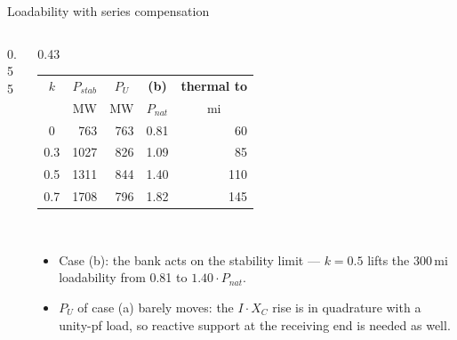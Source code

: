 \begin{frame}{Loadability with series compensation}
  \begin{columns}[c,onlytextwidth]
    \begin{column}{0.55\textwidth}\centering
    \end{column}
    \begin{column}{0.43\textwidth}
      \renewcommand{\arraystretch}{1.15}
      {\footnotesize
      \begin{tabular}{@{}c r r r r@{}}
        \textbf{$k$} & \multicolumn{1}{c}{\textbf{$P_{stab}$}}
                     & \multicolumn{1}{c}{\textbf{$P_{U}$}}
                     & \multicolumn{1}{c}{\textbf{(b)}}
                     & \multicolumn{1}{c}{\textbf{thermal to}} \\
                     & \multicolumn{1}{c}{MW} & \multicolumn{1}{c}{MW}
                     & \multicolumn{1}{c}{$P_{nat}$} & \multicolumn{1}{c}{mi} \\
        \hline
        0   &  763 & 763 & 0.81 &  60 \\
        0.3 & 1027 & 826 & 1.09 &  85 \\
        0.5 & 1311 & 844 & 1.40 & 110 \\
        0.7 & 1708 & 796 & 1.82 & 145 \\
        \hline
      \end{tabular}}\\[0.5em]
      {\small
      \begin{itemize}
        \setlength{\itemsep}{0.3em}
        \item Case (b): the bank acts on the stability limit --- $k=0.5$
              lifts the 300\,mi loadability from 0.81 to $1.40\cdot P_{nat}$.
        \item $P_U$ of case (a) barely moves: the $I\cdot X_C$ rise is in
              quadrature with a unity-pf load, so reactive support at the
              receiving end is needed as well.
      \end{itemize}}
    \end{column}
  \end{columns}
\end{frame}
